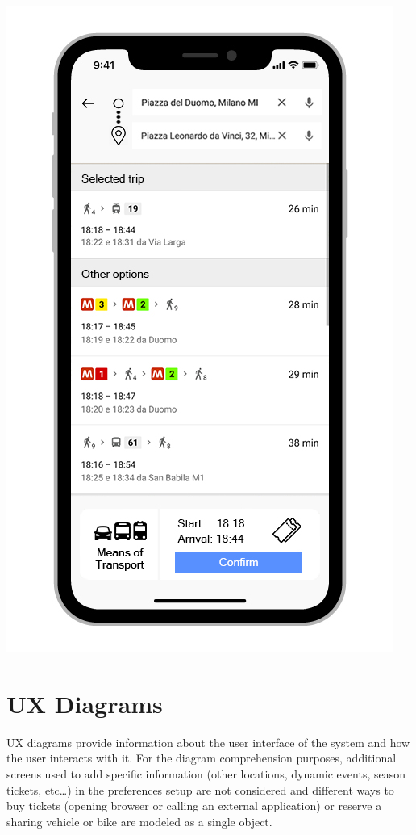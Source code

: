 \begin{center}
\includegraphics[scale=2.4]{MainMatter/images/ui/customized}

\end{center}
%
%
%
%
\section{UX Diagrams}
UX diagrams provide information about the user interface of the system and how the user interacts with it.
For the diagram comprehension purposes, additional screens used to add specific information (other locations, dynamic events, season tickets, etc…) in the preferences setup are not considered and different ways to buy tickets (opening browser or calling an external application) or reserve a sharing vehicle or bike are modeled as a single object.

